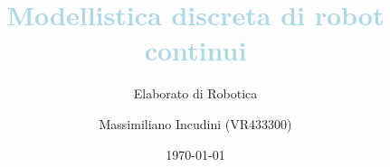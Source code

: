 \title{\Large\textcolor{lightblue}{Modellistica discreta di robot continui}}
\subtitle{Elaborato di Robotica}
\author{Massimiliano Incudini (VR433300)}
\date{\today}

\begin{frame}
\maketitle
\end{frame}